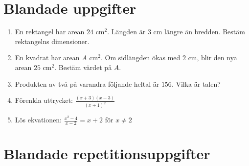 \documentclass[a4paper,11pt]{article}
\begin{document}
\section{Blandade uppgifter}

\begin{enumerate}[label=\textbf{\arabic*.}]
    \item En rektangel har arean $24\text{ cm}^2$. Längden är $3\text{ cm}$ längre än bredden. Bestäm rektangelns dimensioner.
    
    \item En kvadrat har arean $A\text{ cm}^2$. Om sidlängden ökas med $2\text{ cm}$, blir den nya arean $25\text{ cm}^2$. Bestäm värdet på $A$.
    
    \item Produkten av två på varandra följande heltal är $156$. Vilka är talen?
    
    \item Förenkla uttrycket: $\frac{(x+3)(x-3)}{(x+1)^2}$
    
    \item Lös ekvationen: $\frac{x^2-4}{x-2} = x+2$ för $x \neq 2$
\end{enumerate}

\section{Blandade repetitionsuppgifter}
\end{document}

